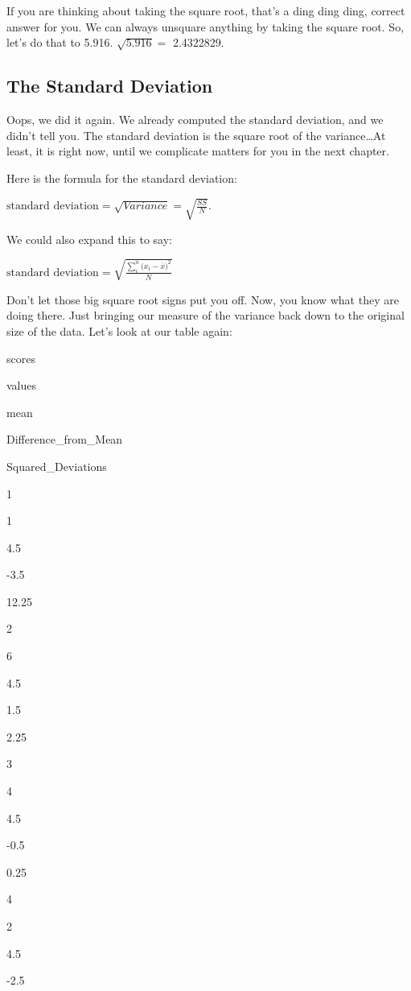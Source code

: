 \documentclass[
]{book}
\begin{document}
If you are thinking about taking the square root, that's a ding ding ding, correct answer for you. We can always unsquare anything by taking the square root. So, let's do that to 5.916. \(\sqrt{5.916} =\) 2.4322829.

\hypertarget{the-standard-deviation}{%
\subsection{The Standard Deviation}\label{the-standard-deviation}}

Oops, we did it again. We already computed the standard deviation, and we didn't tell you. The standard deviation is the square root of the variance\ldots At least, it is right now, until we complicate matters for you in the next chapter.

Here is the formula for the standard deviation:

\(\text{standard deviation} = \sqrt{Variance} = \sqrt{\frac{SS}{N}}\).

We could also expand this to say:

\(\text{standard deviation} = \sqrt{\frac{\sum_{i}^{n}({x_{i}-\bar{x})^2}}{N}}\)

Don't let those big square root signs put you off. Now, you know what they are doing there. Just bringing our measure of the variance back down to the original size of the data. Let's look at our table again:

scores

values

mean

Difference\_from\_Mean

Squared\_Deviations

1

1

4.5

-3.5

12.25

2

6

4.5

1.5

2.25

3

4

4.5

-0.5

0.25

4

2

4.5

-2.5
\end{document}

